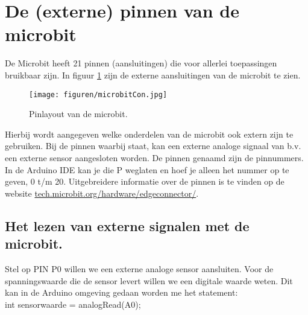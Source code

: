 \section{De (externe) pinnen van de microbit}

De Microbit heeft 21 pinnen (aansluitingen) die voor allerlei toepassingen bruikbaar zijn. In figuur \ref{fig:ardPinB} zijn de externe aansluitingen van de microbit te zien. 
\begin{figure}[h!]
	\captionsetup{justification=centering}
	\texttt{[image: figuren/microbitCon.jpg]}
	\centering
	\caption{Pinlayout van de microbit.}
	\label{fig:ardPinB}
\end{figure}
Hierbij wordt aangegeven welke onderdelen van de microbit ook extern zijn te gebruiken. Bij de pinnen waarbij  staat, kan een externe analoge signaal van b.v. een externe sensor aangesloten worden. De pinnen genaamd  zijn de pinnummers. In de Arduino IDE kan je die P weglaten en hoef je alleen het nummer op te geven, 0 t/m 20. Uitgebreidere informatie over de pinnen is te vinden op de website \href{https://tech.microbit.org/hardware/edgeconnector/}{tech.microbit.org/hardware/edgeconnector/}.\\

\subsection{Het lezen van externe signalen met de microbit.}

Stel op PIN P0 willen we een externe analoge sensor aansluiten. Voor de spanningswaarde die de sensor levert willen we een digitale waarde weten. 
Dit kan in de Arduino omgeving gedaan worden me het statement:\\

int sensorwaarde = \textcolor{arduinoOrange}{analogRead}(A0);

